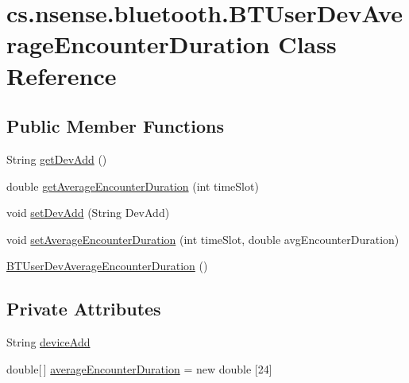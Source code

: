 \hypertarget{classcs_1_1nsense_1_1bluetooth_1_1_b_t_user_dev_average_encounter_duration}{\section{cs.\-nsense.\-bluetooth.\-B\-T\-User\-Dev\-Average\-Encounter\-Duration Class Reference}
\label{classcs_1_1nsense_1_1bluetooth_1_1_b_t_user_dev_average_encounter_duration}
}
\subsection*{Public Member Functions}
\begin{DoxyCompactItemize}
\item 
String \hyperlink{classcs_1_1nsense_1_1bluetooth_1_1_b_t_user_dev_average_encounter_duration_a9154fc2f824a67734a02f7a7ea594482}{get\-Dev\-Add} ()
\item 
double \hyperlink{classcs_1_1nsense_1_1bluetooth_1_1_b_t_user_dev_average_encounter_duration_a499fac82a22295b16bd094eceef255c9}{get\-Average\-Encounter\-Duration} (int time\-Slot)
\item 
void \hyperlink{classcs_1_1nsense_1_1bluetooth_1_1_b_t_user_dev_average_encounter_duration_aeeedffcff8c10d5ec6570b97e317d8ee}{set\-Dev\-Add} (String Dev\-Add)
\item 
void \hyperlink{classcs_1_1nsense_1_1bluetooth_1_1_b_t_user_dev_average_encounter_duration_a08d743abdc7a9c316fa4510b51c7a08f}{set\-Average\-Encounter\-Duration} (int time\-Slot, double avg\-Encounter\-Duration)
\item 
\hyperlink{classcs_1_1nsense_1_1bluetooth_1_1_b_t_user_dev_average_encounter_duration_a275e63f11d6f4749c7a3d2c0de9e02bc}{B\-T\-User\-Dev\-Average\-Encounter\-Duration} ()
\end{DoxyCompactItemize}
\subsection*{Private Attributes}
\begin{DoxyCompactItemize}
\item 
String \hyperlink{classcs_1_1nsense_1_1bluetooth_1_1_b_t_user_dev_average_encounter_duration_a305c3c34715193b2ca317cc953c29adf}{device\-Add}
\item 
double\mbox{[}$\,$\mbox{]} \hyperlink{classcs_1_1nsense_1_1bluetooth_1_1_b_t_user_dev_average_encounter_duration_a7104edf8ee60767ca5637105fab2882d}{average\-Encounter\-Duration} = new double \mbox{[}24\mbox{]}
\end{DoxyCompactItemize}


